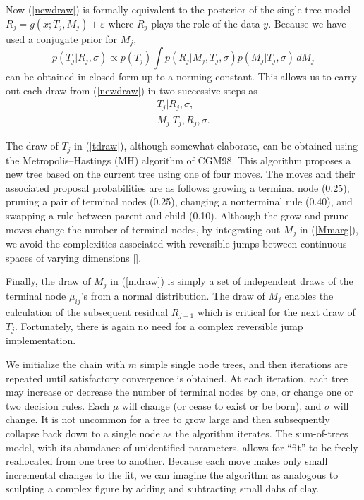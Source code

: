 \documentclass[aoas,nameyear,dvips]{arximspdf}
\let\epsilon\varepsilon
\begin{document}
Now (\ref{newdraw}) is formally equivalent to the posterior of the
single tree model  $R_j = g(x; T_j,M_j) + \epsilon$ where $R_j$
plays the role of the data $y$.  Because we have used a conjugate
prior for $M_j$,
\begin{equation}\label{Mmarg}
p(T_j | R_j,\sigma) \propto p(T_j) \int p(R_j | M_j,T_j, \sigma)
p(M_j|T_j,\sigma) \,dM_j
\end{equation}
can be obtained in closed form up to a norming constant.  This
allows us to carry out each draw from (\ref{newdraw})
in two successive steps as
\begin{eqnarray} \label{tdraw}
&T_j | R_j,\sigma,&
\\ \label{mdraw}
&M_j| T_j, R_j, \sigma .&
\end{eqnarray}

The draw of $T_j$ in (\ref{tdraw}), although somewhat elaborate,
can be obtained using the Metropolis--Hastings (MH) algorithm of
CGM98. This algorithm proposes a new tree based on the current
tree using one of four moves.  The moves and their associated
proposal probabilities are as follows: growing a terminal node (0.25),
pruning a pair of terminal nodes (0.25), changing a nonterminal
rule (0.40), and swapping a rule between parent and child (0.10).
Although the grow and prune moves change the number of
terminal nodes,
by integrating out $M_j$ in (\ref{Mmarg}), we
avoid the complexities associated with reversible jumps between
continuous spaces of varying dimensions [\citet{Gre1995}].

Finally, the draw of $M_j$ in (\ref{mdraw}) is simply a set of
independent draws of the terminal node $\mu_{ij}$'s from a normal
distribution. The draw of $M_j$ enables the calculation of the
subsequent residual $R_{j+1}$ which is critical for the next draw
of $T_j$. Fortunately, there is again no need for a complex
reversible jump implementation.

We initialize the chain with $m$ simple single node trees, and then
iterations are repeated until satisfactory convergence is
obtained.  At each iteration, each tree may increase or decrease
the number of terminal nodes by one, or change one or two decision
rules.  Each $\mu$ will change (or cease to exist or be born), and
$\sigma$ will change. It is not uncommon for a tree to grow large
and then subsequently collapse back down to a single node as the
algorithm iterates. The sum-of-trees model, with its abundance of
unidentified parameters, allows for ``fit'' to be freely
reallocated from one tree to another. Because each move makes only
small incremental changes to the fit, we can imagine the algorithm
as analogous to sculpting a complex figure by adding and
subtracting small dabs of clay.
\end{document}
